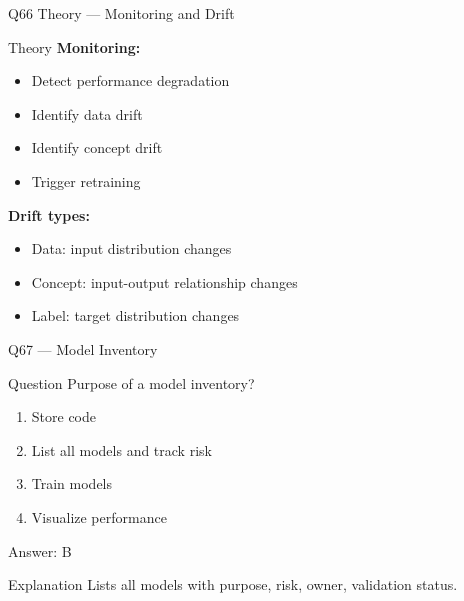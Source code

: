 \documentclass[aspectratio=169,8pt]{beamer}
\begin{document}
	\begin{frame}{Q66 Theory --- Monitoring and Drift}
		\begin{block}{Theory}
			\textbf{Monitoring:}
			\begin{itemize}
				\item Detect performance degradation
				\item Identify data drift
				\item Identify concept drift
				\item Trigger retraining
			\end{itemize}
			\textbf{Drift types:}
			\begin{itemize}
				\item Data: input distribution changes
				\item Concept: input-output relationship changes
				\item Label: target distribution changes
			\end{itemize}
		\end{block}
	\end{frame}
	
	\begin{frame}{Q67 --- Model Inventory}
		\begin{block}{Question}
			Purpose of a model inventory?
		\end{block}
		\begin{enumerate}[label=\Alph*.]
			\item Store code
			\item List all models and track risk
			\item Train models
			\item Visualize performance
		\end{enumerate}
		\begin{exampleblock}{Answer: B}
		\end{exampleblock}
		\begin{block}{Explanation}
			Lists all models with purpose, risk, owner, validation status.
		\end{block}
	\end{frame}
	
\end{document}
